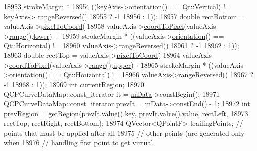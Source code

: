 \begin{DoxyCode}
{18953       strokeMargin *
18954           ((keyAxis->\hyperlink{class_q_c_p_axis_a57483f2f60145ddc9e63f3af53959265}{orientation}() == Qt::Vertical) != keyAxis->
      \hyperlink{class_q_c_p_axis_ade26dc7994ccd8a11f64fd83377ee021}{rangeReversed}()
18955                ? -1
18956                : 1));
18957   \textcolor{keywordtype}{double} rectBottom = valueAxis->\hyperlink{class_q_c_p_axis_ae9289ef7043b9d966af88eaa95b037d1}{pixelToCoord}(
18958       valueAxis->\hyperlink{class_q_c_p_axis_a985ae693b842fb0422b4390fe36d299a}{coordToPixel}(valueAxis->\hyperlink{class_q_c_p_axis_ab1ea79a4f5ea4cf42620f8f51c477ac4}{range}().\hyperlink{class_q_c_p_range_aa3aca3edb14f7ca0c85d912647b91745}{lower}) +
18959       strokeMargin * ((valueAxis->\hyperlink{class_q_c_p_axis_a57483f2f60145ddc9e63f3af53959265}{orientation}() == Qt::Horizontal) !=
18960                               valueAxis->\hyperlink{class_q_c_p_axis_ade26dc7994ccd8a11f64fd83377ee021}{rangeReversed}()
18961                           ? -1
18962                           : 1));
18963   \textcolor{keywordtype}{double} rectTop = valueAxis->\hyperlink{class_q_c_p_axis_ae9289ef7043b9d966af88eaa95b037d1}{pixelToCoord}(
18964       valueAxis->\hyperlink{class_q_c_p_axis_a985ae693b842fb0422b4390fe36d299a}{coordToPixel}(valueAxis->\hyperlink{class_q_c_p_axis_ab1ea79a4f5ea4cf42620f8f51c477ac4}{range}().\hyperlink{class_q_c_p_range_ae44eb3aafe1d0e2ed34b499b6d2e074f}{upper}) -
18965       strokeMargin * ((valueAxis->\hyperlink{class_q_c_p_axis_a57483f2f60145ddc9e63f3af53959265}{orientation}() == Qt::Horizontal) !=
18966                               valueAxis->\hyperlink{class_q_c_p_axis_ade26dc7994ccd8a11f64fd83377ee021}{rangeReversed}()
18967                           ? -1
18968                           : 1));
18969   \textcolor{keywordtype}{int} currentRegion;
18970   QCPCurveDataMap::const\_iterator it = \hyperlink{class_q_c_p_curve_a88d533e455bca96004b049e99168731b}{mData}->constBegin();
18971   QCPCurveDataMap::const\_iterator prevIt = \hyperlink{class_q_c_p_curve_a88d533e455bca96004b049e99168731b}{mData}->constEnd() - 1;
18972   \textcolor{keywordtype}{int} prevRegion = \hyperlink{class_q_c_p_curve_a3af3183f35bd7aebe149f29ae4f1034a}{getRegion}(prevIt.value().key, prevIt.value().value, rectLeft,
18973                              rectTop, rectRight, rectBottom);
18974   QVector<QPointF> trailingPoints; \textcolor{comment}{// points that must be applied after all}
18975                                    \textcolor{comment}{// other points (are generated only when}
18976                                    \textcolor{comment}{// handling first point to get virtual}
}
\end{DoxyCode}
